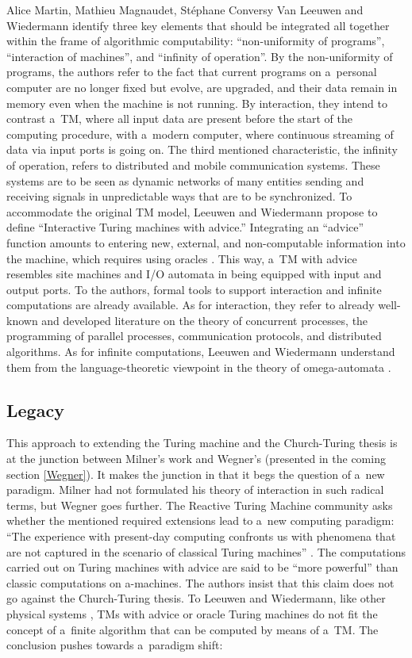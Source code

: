 \begin{artengenv2auth}{Alice Martin, Mathieu Magnaudet, Stéphane Conversy}
Van Leeuwen and Wiedermann identify three key elements that should be integrated all together within the frame of algorithmic computability: ``non-uniformity of programs'', ``interaction of machines'', and ``infinity of operation''. By the non-uniformity of programs, the authors refer to the fact that current programs on a~personal computer are no longer fixed but evolve, are upgraded, and their data remain in memory even when the machine is not running. By interaction, they intend to contrast a~TM, where all input data are present before the start of the computing procedure, with a~modern computer, where continuous streaming of data via input ports is going on. The third mentioned characteristic, the infinity of operation, refers to distributed and mobile communication systems. These systems are to be seen as dynamic networks of many entities sending and receiving signals in unpredictable ways that are to be synchronized. To accommodate the original TM model, Leeuwen and Wiedermann propose to define ``Interactive Turing machines with advice.'' Integrating an ``advice'' function amounts to entering new, external, and non-computable information into the machine, which requires using oracles \parencite{Balcazar1995, Rogers1987}. 
This way, a~TM with advice resembles site machines and I/O automata in being equipped with input and output ports. To the authors, formal tools to support interaction and infinite computations are already available. As for interaction, they refer to already well-known and developed literature on the theory of concurrent processes, the programming of parallel processes, communication protocols, and distributed algorithms. As for infinite computations, Leeuwen and Wiedermann understand them from the language-theoretic viewpoint in the theory of omega-automata \parencite{Staiger1997, Thomas1990}.

\subsection{Legacy}

This approach to extending the Turing machine and the Church-Turing thesis is at the junction between Milner's work and Wegner's (presented in the coming section \ref{Wegner}). It makes the junction in that it begs the question of a~new paradigm. Milner had not formulated his theory of interaction in such radical terms, but Wegner goes further. The Reactive Turing Machine community asks whether the mentioned required extensions lead to a~new computing paradigm: ``The experience with present-day computing confronts us with phenomena that are not captured in the scenario of classical Turing machines'' \parencite{VanLeeuwen2001}. The computations carried out on Turing machines with advice are said to be ``more powerful'' than classic computations on a-machines. The authors insist that this claim does not go against the Church-Turing thesis. To Leeuwen and Wiedermann, like other physical systems \parencite{Pour-El1999}, TMs with advice or oracle Turing machines do not fit the concept of a~finite algorithm that can be computed by means of a~TM. The conclusion pushes towards a~paradigm shift: 


\end{artengenv2auth}
